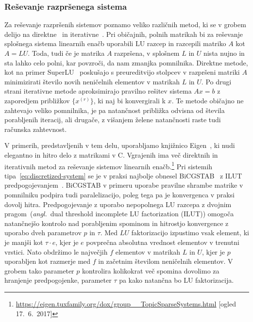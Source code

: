 \documentclass[12pt,a4paper,twoside]{article}
\theoremstyle{definition} %
\theoremstyle{plain} %
\numberwithin{equation}{section}
\newcommand{\ang}[1]{(\hspace{-1.5px}\textit{angl.}\ #1)}
\newcommand{\CC}{C\nolinebreak\hspace{-.05em}\raisebox{.4ex}{\tiny\bf +}\nolinebreak\hspace{-.10em}\raisebox{.4ex}{\tiny\bf +}}
\begin{document}
\subsubsection{Reševanje razpršenega sistema}
\label{sec:solve-sparse}
Za reševanje razpršenih sistemov poznamo veliko različnih metod, ki se v grobem delijo na
direktne~\cite{davis2006direct} in iterativne~\cite{saad2003iterative}. Pri običajnih, polnih
matrikah bi za reševanje splošnega sistema linearnih enačb uporabili LU razcep in razcepili matriko
$A$ kot $A = LU$. Toda, tudi če je matrika $A$ razpršena, v splošnem $L$ in $U$ nista nujno in sta
lahko celo polni, kar povzroči, da nam zmanjka pomnilnika. Direktne metode, kot na primer
SuperLU~\cite{li2005overview} poskušajo s preureditvijo stolpcev v razpršeni matriki $A$
minimizirati število novih neničelnih elementov v matrikah $L$ in $U$. Po drugi strani iterativne
metode aproksimirajo pravilno rešitev sistema $Ax=b$ z zaporedjem približkov $\{x^{(r)}\}$, ki naj
bi konvergirali k $x$. Te metode običajno ne zahtevajo veliko pomnilnika, je pa natančnost približka
odvisna od števila porabljenih iteracij, ali drugače, z višanjem želene natančnosti raste tudi
računska zahtevnost.

V primerih, predstavljenih v tem delu, uporabljamo knjižnico Eigen~\cite{eigenweb}, ki nudi
elegantno in hitro delo z matrikami v \CC. Vgrajenih ima več direktnih in iterativnih metod za
reševanje sistemov linearnih
enačb.\footnote{\url{https://eigen.tuxfamily.org/dox/group__TopicSparseSystems.html}
[ogled 17.\ 6.\ 2017]}
Pri sistemih tipa~\eqref{eq:discretized-system} se je v praksi najbolje obnesel
BiCGSTAB~\cite{van1992bi} z ILUT predpogojevanjem~\cite{saad1994ilut}. BiCGSTAB v primeru uporabe
pravilne shrambe matrike v pomnilniku podpira tudi paralelizacijo, poleg tega pa je konvergenca v
praksi dovolj hitra. Predpogojevanje z uporabo nepopolnega LU razcepa z dvojnim pragom~\ang{dual
threshold incomplete LU factorization (ILUT)} omogoča natančnejšo kontrolo nad porabljenim spominom
in hitrostjo konvergence z uporabo dveh parametrov $p$ in $\tau$. Med $LU$ faktorizacijo izpustimo
vsak element, ki je manjši kot $\tau\cdot e$, kjer je $e$ povprečna absolutna vrednost elementov v
trenutni vrstici. Nato obdržimo le največjih $f$ elementov v matrikah $L$ in $U$, kjer je $p$
uporabljen kot razmerje med $f$ in začetnim številom neničelnih elementov. V grobem tako parameter
$p$ kontrolira kolikokrat več spomina dovolimo za hranjenje predpogojenke, parameter $\tau$ pa kako
natančna bo LU faktorizacija.
\end{document}
